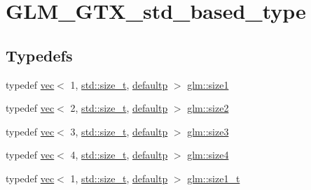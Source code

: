 \hypertarget{group__gtx__std__based__type}{}\section{G\+L\+M\+\_\+\+G\+T\+X\+\_\+std\+\_\+based\+\_\+type}
\label{group__gtx__std__based__type}
\subsection*{Typedefs}
\begin{DoxyCompactItemize}
\item 
typedef \mbox{\hyperlink{structglm_1_1vec}{vec}}$<$ 1, \mbox{\hyperlink{_s_d_l__config__winrt_8h_a7c94ea6f8948649f8d181ae55911eeaf}{std\+::size\+\_\+t}}, \mbox{\hyperlink{namespaceglm_a36ed105b07c7746804d7fdc7cc90ff25a9d21ccd8b5a009ec7eb7677befc3bf51}{defaultp}} $>$ \mbox{\hyperlink{group__gtx__std__based__type_gaf471290b8165697d088a943263fc8af1}{glm\+::size1}}
\item 
typedef \mbox{\hyperlink{structglm_1_1vec}{vec}}$<$ 2, \mbox{\hyperlink{_s_d_l__config__winrt_8h_a7c94ea6f8948649f8d181ae55911eeaf}{std\+::size\+\_\+t}}, \mbox{\hyperlink{namespaceglm_a36ed105b07c7746804d7fdc7cc90ff25a9d21ccd8b5a009ec7eb7677befc3bf51}{defaultp}} $>$ \mbox{\hyperlink{group__gtx__std__based__type_ga432937b68775c79e4556150e769c6e6b}{glm\+::size2}}
\item 
typedef \mbox{\hyperlink{structglm_1_1vec}{vec}}$<$ 3, \mbox{\hyperlink{_s_d_l__config__winrt_8h_a7c94ea6f8948649f8d181ae55911eeaf}{std\+::size\+\_\+t}}, \mbox{\hyperlink{namespaceglm_a36ed105b07c7746804d7fdc7cc90ff25a9d21ccd8b5a009ec7eb7677befc3bf51}{defaultp}} $>$ \mbox{\hyperlink{group__gtx__std__based__type_ga2da33d9da32b31af75f036d948b54de5}{glm\+::size3}}
\item 
typedef \mbox{\hyperlink{structglm_1_1vec}{vec}}$<$ 4, \mbox{\hyperlink{_s_d_l__config__winrt_8h_a7c94ea6f8948649f8d181ae55911eeaf}{std\+::size\+\_\+t}}, \mbox{\hyperlink{namespaceglm_a36ed105b07c7746804d7fdc7cc90ff25a9d21ccd8b5a009ec7eb7677befc3bf51}{defaultp}} $>$ \mbox{\hyperlink{group__gtx__std__based__type_ga6051b5077b52ff8ea48a5207d5076aa5}{glm\+::size4}}
\item 
typedef \mbox{\hyperlink{structglm_1_1vec}{vec}}$<$ 1, \mbox{\hyperlink{_s_d_l__config__winrt_8h_a7c94ea6f8948649f8d181ae55911eeaf}{std\+::size\+\_\+t}}, \mbox{\hyperlink{namespaceglm_a36ed105b07c7746804d7fdc7cc90ff25a9d21ccd8b5a009ec7eb7677befc3bf51}{defaultp}} $>$ \mbox{\hyperlink{group__gtx__std__based__type_ga5bf40bbca3cb66bbd7cc0c389c3c0c56}{glm\+::size1\+\_\+t}}

\end{DoxyCompactItemize}
